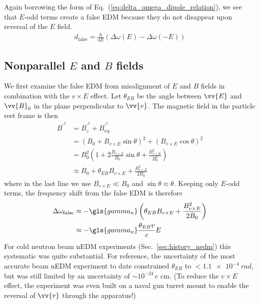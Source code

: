 Again borrowing the form of Eq.~(\ref{eq:delta_omega_dipole_relation}), we see that $E$-odd terms create a false EDM because they do not disappear upon reversal of the $E$ field.
%
\begin{gather}
    d_\text{false}=\frac{\hbar}{4E}(\Delta\omega(E)-\Delta\omega(-E))
\end{gather}

\subsection*{
    \texorpdfstring{Nonparallel $E$ and $B$ fields}
                    {Nonparallel E and B fields}
}

We first examine the false EDM from misalignment of $E$ and $B$ fields in combination with the $v\times E$ effect. Let $\theta_{EB}$ be the angle between $\vv{E}$ and $\vv{B}_0$ in the plane perpendicular to $\vv{v}$. The magnetic field in the particle rest frame is then~\cite{lamoreaux_experimental_2009}
%
\begin{align}
    B^{\prime^2} &= B^{\prime^2}_z + B^{\prime^2}_{xy} \\
    &= (B_0 +  B_{v\times E}\sin\theta)^2 + ( B_{v\times E}\cos\theta)^2 \\
    &= B_0^2\left(1 + 2\frac{ B_{v\times E}}{B_0}\sin\theta + \frac{ B_{v\times E}^2}{B_0^2}\right)\\
    &\approx B_0 + \theta_{EB} B_{v\times E} + \frac{B_{v\times E}^2}{2B_0}
\end{align}
%
where in the last line we use $B_{v\times E} \ll B_0$ and $\sin\theta\approx\theta$. Keeping only $E$-odd terms, the frequency shift from the false EDM is therefore
%
\begin{align}
    \Delta\omega_\text{false} &\approx -\gls{gamma_n}\left( \theta_{EB} B_{v\times E} + \frac{B_{v\times E}^2}{2B_0} \right) \label{eq:vxE_motional_shift}\\
    &\approx -\gls{gamma_n} \frac{\theta_{EB}v}{c}E 
\end{align}
%
For cold neutron beam nEDM experiments (Sec.~\ref{sec:history_nedm}) this systematic was quite substantial. For reference, the uncertainty of the most accurate beam nEDM experiment to date \cite{dress_nedm_1977} constrained $\theta_{EB}$ to $<\qty{1.1e-4}{rad}$, but was still limited by an uncertainty of $\sim 10^{-24}\,e\text{ cm}$. (To reduce the $v\times E$ effect, the experiment was even built on a naval gun turret mount to enable the reversal of $\vv{v}$ through the apparatus!) 

